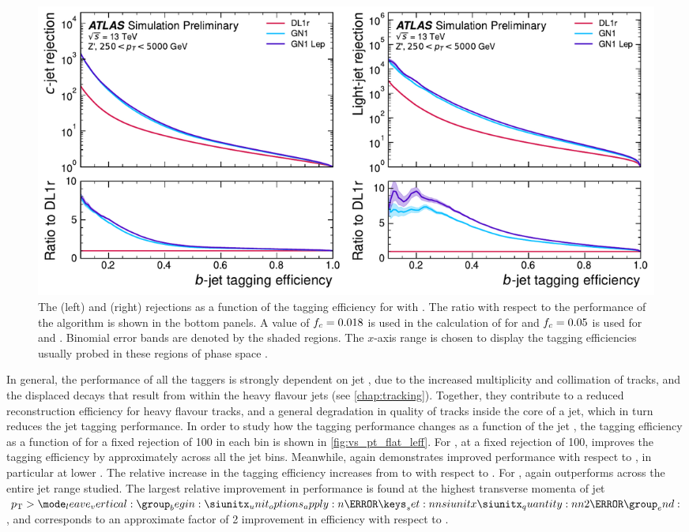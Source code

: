 \begin{figure}[!p]
    \centering
    \includegraphics[width=\textwidth]{chapters/gnn_tagger/figs/results/main/zprime/zprime_roc_btag.pdf}
    \caption{The \cjet (left) and \ljet (right) rejections as a function of the \bjet tagging efficiency for \Zprimejets with \Zprimept .
             The ratio with respect to the performance of the \DLr algorithm is shown in the bottom panels.
             A value of $f_c = 0.018$ is used in the calculation of \Db for \DLr and $f_c = 0.05$ is used for \GNN and \GNNLep.
             Binomial error bands are denoted by the shaded regions.
             The $x$-axis range is chosen to display the \bjet tagging efficiencies usually probed in these regions of phase space \cite{ATL-PHYS-PUB-2022-027}.}
    \label{fig:zprime_btag_roc}
\end{figure}

In general, the performance of all the taggers is strongly dependent on jet \pt, due to the increased multiplicity and collimation of tracks, and the displaced decays that result from within the heavy flavour jets (see \cref{chap:tracking}).
Together, they contribute to a reduced reconstruction efficiency for heavy flavour tracks, and a general degradation in quality of tracks inside the core of a jet, which in turn reduces the jet tagging performance.
In order to study how the tagging performance changes as a function of the jet \pt, the \bjet tagging efficiency as a function of \pt for a fixed \ljet rejection of 100 in each bin is shown in \cref{fig:vs_pt_flat_leff}.
For \ttbarjets, at a fixed \ljet rejection of 100, \GNN improves the \bjet tagging efficiency by approximately  across all the jet \pt bins.
Meanwhile, \GNNLep again demonstrates improved performance with respect to \GNN, in particular at lower \pt.
The relative increase in the \bjet tagging efficiency increases from  to  with respect to \DLr.
For \Zprimejets, \GNN again outperforms \DLr across the entire jet \pt range studied.
The largest relative improvement in performance is found at the highest transverse momenta of jet $\pt > \SI{2}{\TeV}$, and corresponds to an approximate factor of 2 improvement in efficiency with respect to \DLr.


